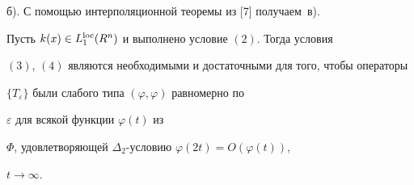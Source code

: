 б). С помощью интерполяционной теоремы из [7] по\-лу\-чаем~в). 


 


\begin{thm} 


Пусть $k(x)\in L^{\operatorname{loc}}_1(R^n)$ и выполнено условие $(2)$. Тогда условия 


$(3)$, $(4)$ являются необходимыми и достаточными для того, чтобы операторы 


$\{T_\varepsilon\}$ были слабого типа $(\varphi,\varphi)$ равномерно по 


$\varepsilon$ для всякой функции $\varphi(t)$ из 


$\Phi$, удовлетворяющей $\Delta_2$-условию $\varphi(2t)=O(\varphi(t))$, 


$t\to\infty$. 


\end{thm} 


 


